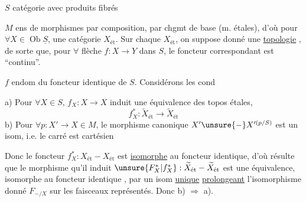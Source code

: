 $S$ catégorie avec produits fibrés

$M$ ens de morphismes  par composition, par chgmt de base (m.  étales), d'où pour $\forall X\in\operatorname{Ob}\underline S$, une catégorie $X_{\text{ét}}$.
Sur chaque $X_{\text{ét}}$, on suppose donné une \uline{topologie} , de sorte que,  pour $\forall$ flèche $f:X\to Y$ dans $S$, le foncteur correspondant
est ``continu''.

$f$ endom du foncteur identique de $S$. Considérons  les cond

a) Pour $\forall X\in S$, $f_X:X\to X$ induit une équivalence des topos étales,
\[
f_X^*:\widetilde X_{\text{ét}}\longrightarrow\widetilde X_{\text{ét}}
\]
b) Pour $\forall p:X'\to X\in M$, le morphisme canonique $X'\unsure{\mathbin{-}}X'^{(p/S)}$ est un isom, i.e. le carré
est cartésien

Donc  le foncteur $f_X^*:X_{\text{ét}}\mathbin{-}X_{\text{ét}}$ est \uline{isomorphe} au foncteur identique, d'où résulte que le morphisme  qu'il induit $\unsure{F_X^*|f_X^*}:\widetilde X_{\text{ét}}\mathbin{-}\widetilde X_{\text{ét}}$ est une équivalence, isomorphe au foncteur identique , par un isom \uline{unique} \uline{prolongeant} l'isomorphisme donné $F_{-/X}$ sur les faisceaux représentés. Donc b) $\Rightarrow$ a).
